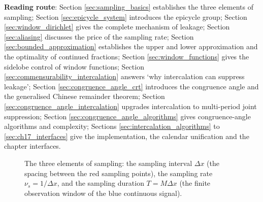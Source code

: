 \begin{remark}
\textbf{Reading route}: Section \ref{sec:sampling_basics} establishes the three elements of sampling; Section \ref{sec:epicycle_system} introduces the epicycle group; Section \ref{sec:window_dirichlet} gives the complete mechanism of leakage; Section \ref{sec:aliasing} discusses the price of the sampling rate; Section \ref{sec:bounded_approximation} establishes the upper and lower approximation and the optimality of continued fractions; Section \ref{sec:window_functions} gives the sidelobe control of window functions; Section \ref{sec:commensurability_intercalation} answers `why intercalation can suppress leakage'; Section \ref{sec:congruence_angle_crt} introduces the congruence angle and the generalised Chinese remainder theorem; Section \ref{sec:congruence_angle_intercalation} upgrades intercalation to multi-period joint suppression; Section \ref{sec:congruence_angle_algorithms} gives congruence-angle algorithms and complexity; Sections \ref{sec:intercalation_algorithms} to \ref{sec:ch17_interfaces} give the implementation, the calendar unification and the chapter interfaces.
\end{remark}

\begin{figure}[htbp]
\centering
{}
\caption{The three elements of sampling: the sampling interval $\Delta x$ (the spacing between the red sampling points), the sampling rate $\nu_s=1/\Delta x$, and the sampling duration $T=M\Delta x$ (the finite observation window of the blue continuous signal).}
\label{fig:sampling_three_elements}
\end{figure}

